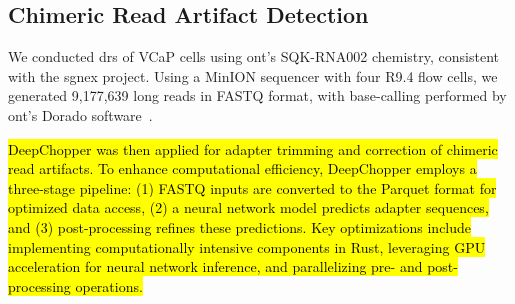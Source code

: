 \documentclass[pdflatex,sn-nature, lineno]{sn-jnl}%
\begin{document}


\subsection{Chimeric Read Artifact Detection}

We conducted \gls{drs} of VCaP cells using \gls{ont}'s SQK-RNA002 chemistry, consistent with the \gls{sgnex} project. Using a MinION sequencer with four R9.4 flow cells, we generated 9,177,639 long reads in FASTQ format, with base-calling performed by \gls{ont}'s Dorado software~\cite{dorado2023}.

\hl{DeepChopper was then applied for adapter trimming and correction of chimeric read artifacts. To enhance computational efficiency, DeepChopper employs a three-stage pipeline: (1) FASTQ inputs are converted to the Parquet format for optimized data access, (2) a neural network model predicts adapter sequences, and (3) post-processing refines these predictions. Key optimizations include implementing computationally intensive components in Rust, leveraging GPU acceleration for neural network inference, and parallelizing pre- and post-processing operations.}
\end{document}
